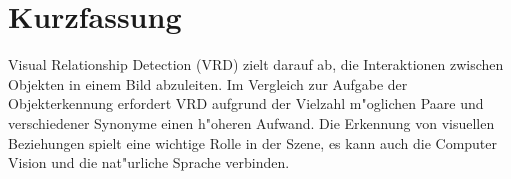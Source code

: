 %
% 


\chapter*{Kurzfassung}


\label{chap:Kurzfassung}

Visual Relationship Detection (VRD) zielt darauf ab, die Interaktionen zwischen Objekten in einem Bild abzuleiten. Im Vergleich zur Aufgabe der Objekterkennung erfordert VRD aufgrund der Vielzahl m"oglichen Paare und verschiedener Synonyme einen h"oheren Aufwand. Die Erkennung von visuellen Beziehungen spielt eine wichtige Rolle in der Szene, es kann auch die Computer Vision und die nat"urliche Sprache verbinden.

